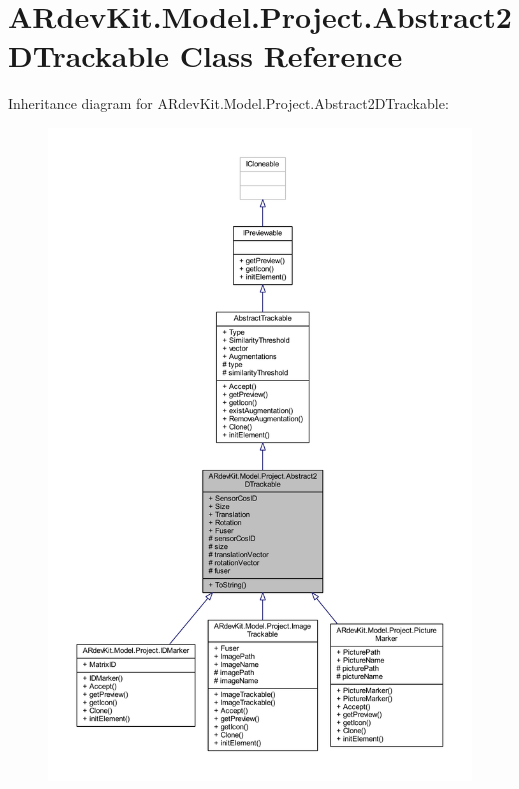 \hypertarget{class_a_rdev_kit_1_1_model_1_1_project_1_1_abstract2_d_trackable}{\section{A\-Rdev\-Kit.\-Model.\-Project.\-Abstract2\-D\-Trackable Class Reference}
\label{class_a_rdev_kit_1_1_model_1_1_project_1_1_abstract2_d_trackable}
}


Inheritance diagram for A\-Rdev\-Kit.\-Model.\-Project.\-Abstract2\-D\-Trackable\-:
\nopagebreak
\begin{figure}[H]
\begin{center}
\leavevmode
\includegraphics[width=350pt]{class_a_rdev_kit_1_1_model_1_1_project_1_1_abstract2_d_trackable__inherit__graph}
\end{center}
\end{figure}


